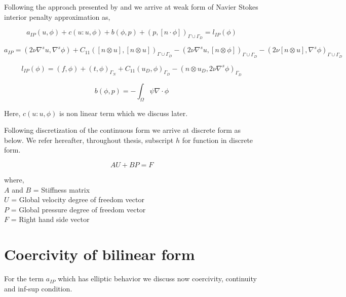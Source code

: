 \documentclass[a4paper,10pt]{book}
\begin{document}
Following the approach presented by \cite{Montlaur} and \cite{Montlaur2} we arrive at weak form of Navier Stokes interior penalty approximation as,

\begin{equation}\label{Navier Stokes weak form}
a_{IP}(u,\phi)+c(u : u, \phi) + b(\phi , p) + ({p},[n \cdot \phi])_{\Gamma \cup \Gamma_D} = l_{IP}(\phi)
\end{equation}

\begin{equation}\label{aIP}
a_{IP} = (2\nu \nabla^s u,\nabla^s \phi) + C_{11}([n \otimes u],[n \otimes u])_{\Gamma \cup \Gamma_D} - (2 \nu {\nabla^s u},[n \otimes \phi])_{\Gamma \cup \Gamma_D} - (2 \nu [n \otimes u], {\nabla^s \phi})_{\Gamma \cup \Gamma_D} 
\end{equation}

\begin{equation}\label{lIP}
l_{IP}(\phi) = (f,\phi) + (t,\phi)_{\Gamma_N} + C_{11}(u_D,\phi)_{\Gamma_D} - (n \otimes u_D, 2 \nu \nabla^s \phi)_{\Gamma_D}
\end{equation}

\begin{equation}\label{b_continuity}
b(\phi,p) = -\int_{\Omega} \psi \nabla \cdot \phi
\end{equation}

Here, $c(u : u, \phi)$ is non linear term which we discuss later.

Following discretization of the continuous form we arrive at discrete form as below. We refer hereafter, throughout thesis, subscript $h$ for function in discrete form.

\begin{equation}\label{Navier Stokes Matrix form}
A U + B P = F
\end{equation}

where,\\
$A$ and $B$ = Stiffness matrix\\
$U$ = Global velocity degree of freedom vector\\
$P$ = Global pressure degree of freedom vector\\
$F$ = Right hand side vector\\

\section{Coercivity of bilinear form} 

For the term $a_{IP}$ which has elliptic behavior we discuss now coercivity, continuity and inf-sup condition\cite{riviere}.
\end{document}
